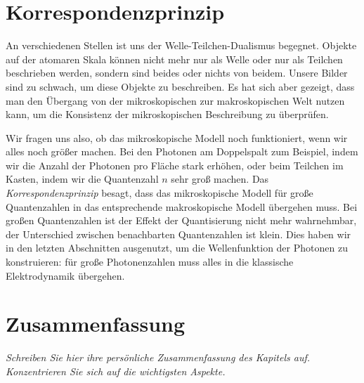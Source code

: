 \section{Korrespondenzprinzip}
An verschiedenen Stellen ist uns der Welle-Teilchen-Dualismus begegnet. Objekte auf der atomaren Skala können nicht mehr nur als Welle oder nur als Teilchen beschrieben werden, sondern sind beides oder nichts von beidem. Unsere Bilder sind zu schwach, um diese Objekte zu beschreiben. Es hat sich aber gezeigt, dass man den Übergang von der mikroskopischen zur makroskopischen Welt nutzen kann, um die Konsistenz der mikroskopischen Beschreibung zu überprüfen. 

Wir fragen uns also, ob das mikroskopische Modell noch funktioniert, wenn wir alles noch größer machen. Bei den Photonen am Doppelspalt zum Beispiel, indem wir die Anzahl der Photonen pro Fläche stark erhöhen, oder beim Teilchen im Kasten, indem wir die Quantenzahl $n$ sehr groß machen. Das \emph{Korrespondenzprinzip} besagt, dass das mikroskopische Modell für große Quantenzahlen in das entsprechende makroskopische Modell übergehen muss. Bei großen Quantenzahlen ist der Effekt der Quantisierung nicht mehr wahrnehmbar, der Unterschied zwischen benachbarten Quantenzahlen ist klein. Dies haben wir in den letzten Abschnitten ausgenutzt, um die Wellenfunktion der Photonen zu konstruieren: für große Photonenzahlen muss alles in die klassische Elektrodynamik übergehen.




\section{Zusammenfassung}

\textit{Schreiben Sie hier ihre persönliche Zusammenfassung des Kapitels auf. Konzentrieren Sie sich auf die wichtigsten Aspekte.}

\vspace*{10cm}



\printbibliography[segment=\therefsegment,heading=subbibliography]
